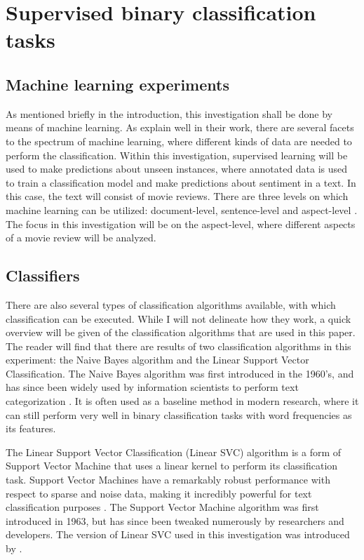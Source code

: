 \documentclass[
10pt, %
a4paper, %
oneside, %
headinclude,footinclude, %
] {book}%
\begin{document}
\section{Supervised binary classification tasks}

\subsection{Machine learning experiments}

As mentioned briefly in the introduction, this investigation shall be done by means of machine learning. As \citet{mohri2012foundations} explain well in their work, there are several facets to the spectrum of machine learning, where different kinds of data are needed to perform the classification. Within this investigation, supervised learning will be used to make predictions about unseen instances, where annotated data is used to train a classification model and make predictions about sentiment in a text. In this case, the text will consist of movie reviews. There are three levels on which machine learning can be utilized: document-level, sentence-level and aspect-level \citep{manek2016aspect}. The focus in this investigation will be on the aspect-level, where different aspects of a movie review will be analyzed.

\subsection{Classifiers}

There are also several types of classification algorithms available, with which classification can be executed. While I will not delineate how they work, a quick overview will be given of the classification algorithms that are used in this paper. The reader will find that there are results of two classification algorithms in this experiment: the Naive Bayes algorithm and the Linear Support Vector Classification. The Naive Bayes algorithm was first introduced in the 1960's, and has since been widely used by information scientists to perform text categorization \citep{russell1995artificial}. It is often used as a baseline method in modern research, where it can still perform very well in binary classification tasks with word frequencies as its features.

The Linear Support Vector Classification (Linear SVC) algorithm is a form of Support Vector Machine that uses a linear kernel to perform its classification task. Support Vector Machines have a remarkably robust performance with respect to sparse and noise data, making it incredibly powerful for text classification purposes \citep{furey2000support}. The Support Vector Machine algorithm was first introduced in 1963, but has since been tweaked numerously by researchers and developers. The version of Linear SVC used in this investigation was introduced by \citet{cortes1995support}.
\end{document}
